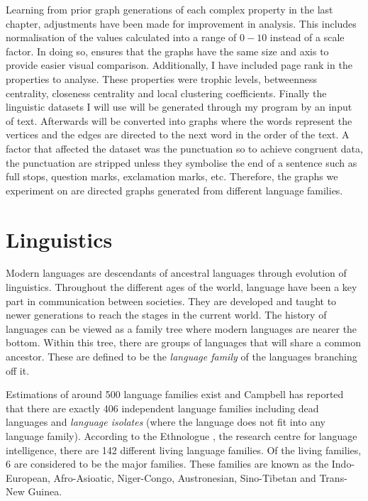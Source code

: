 Learning from prior graph generations of each complex property in the last chapter, adjustments have been made for improvement in analysis. This includes normalisation of the values calculated into a range of $0-10$ instead of a scale factor. In doing so, ensures that the graphs have the same size and axis to provide easier visual comparison. Additionally, I have included page rank in the properties to analyse. These properties were trophic levels, betweenness centrality, closeness centrality and local clustering coefficients. Finally the linguistic datasets I will use will be generated through my program by an input of text. Afterwards will be converted into graphs where the words represent the vertices and the edges are directed to the next word in the order of the text. A factor that affected the dataset was the punctuation so to achieve congruent data, the punctuation are stripped unless they symbolise the end of a sentence such as full stops, question marks, exclamation marks, etc. Therefore, the graphs we experiment on are directed graphs generated from different language families.

\section{Linguistics}
Modern languages are descendants of ancestral languages through evolution of linguistics. Throughout the different ages of the world, language have been a key part in communication between societies. They are developed and taught to newer generations to reach the stages in the current world. The history of languages can be viewed as a family tree where modern languages are nearer the bottom. Within this tree, there are groups of languages that will share a common ancestor. These are defined to be the \emph{language family} of the languages branching off it.

Estimations of around 500 language families exist and Campbell \cite{campbell2018many} has reported that there are exactly 406 independent language families including dead languages and \emph{language isolates} (where the language does not fit into any language family). According to the Ethnologue \cite{eberhard2023a}, the research centre for language intelligence, there are 142 different living language families. Of the living families, 6 are considered to be the major families. These families are known as the Indo-European, Afro-Asioatic, Niger-Congo, Austronesian, Sino-Tibetan and Trans-New Guinea.

